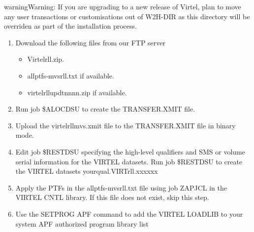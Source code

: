 \documentclass[letterpaper,10pt,english]{sphinxmanual}
\begin{document}
\begin{sphinxadmonition}{warning}{Warning:}
If you are upgrading to a new release of Virtel, plan to move any user transactions or customisations out of W2H-DIR as this directory will be overriden as part of the installation process.
\end{sphinxadmonition}
\begin{enumerate}
\item {} 
Download the following files from our FTP server 
\begin{itemize}
\item {} 
Virtelrll.zip.

\item {} 
allptfs-mvsrll.txt if available.

\item {} 
virtelrllupdtnnnn.zip if available.

\end{itemize}

\item {} 
Run job \$ALOCDSU to create the TRANSFER.XMIT file.

\item {} 
Upload the virtelrllmvs.xmit file to the TRANSFER.XMIT file in binary mode.

\item {} 
Edit job \$RESTDSU specifying the high-level qualifiers and SMS or volume serial information for the VIRTEL datasets. Run job \$RESTDSU to create the VIRTEL datasets yourqual.VIRTrll.xxxxxx

\item {} 
Apply the PTFs in the allptfs-mvsrll.txt file using job ZAPJCL in the VIRTEL CNTL library. If this file does not exist, skip this step.

\item {} 
Use the SETPROG APF command to add the VIRTEL LOADLIB to your system APF authorized program library list

\end{enumerate}
\end{document}
